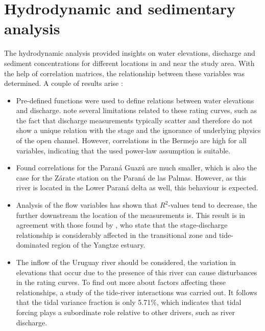 \section{Hydrodynamic and sedimentary analysis}
The hydrodynamic analysis provided insights on water elevations, discharge and sediment concentrations for different locations in and near the study area. With the help of correlation matrices, the relationship between these variables was determined. A couple of results arise
:
\begin{itemize}
    \item Pre-defined functions were used to define relations between water elevations and discharge. \textcite{schmidtStageDischargeRelationshipOpen2011} note several limitations related to these rating curves, such as the fact that discharge measurements typically scatter and therefore do not show a unique relation with the stage and the ignorance of underlying physics of the open channel. However, correlations in the Bermejo are high for all variables, indicating that the used power-law assumption is suitable.
    \item Found correlations for the Paraná Guazú are much smaller, which is also the case for the Zárate station on the Paraná de las Palmas. However, as this river is located in the Lower Paraná delta as well, this behaviour is expected.
    \item Analysis of the flow variables has shown that $R^2$-values tend to decrease, the further downstream the location of the measurements is. This result is in agreement with those found by \textcite{songEvaluatingUnderstandingTideriver2024}, who state that the stage-discharge relationship is considerably affected in the transitional zone and tide-dominated region of the Yangtze estuary. 
    \item The inflow of the Uruguay river should be considered, the variation in elevations that occur due to the presence of this river can cause disturbances in the rating curves. To find out more about factors affecting these relationships, a study of the tide-river interactions was carried out. It follows that the tidal variance fraction is only 5.71\%, which indicates that tidal forcing plays a subordinate role relative to other drivers, such as river discharge. 
\end{itemize}

